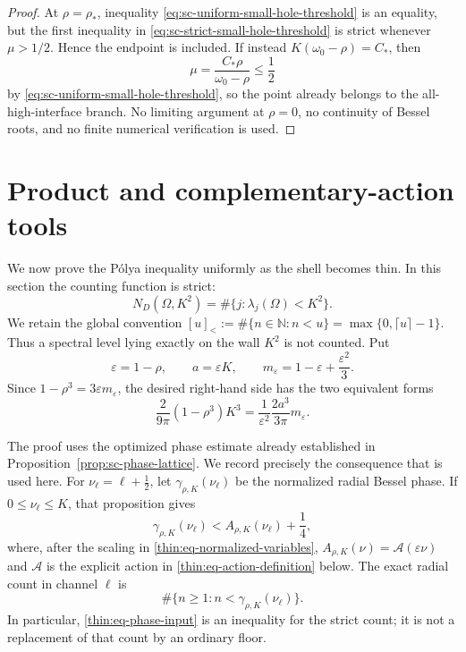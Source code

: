\documentclass[11pt]{article}
\numberwithin{equation}{section}
\theoremstyle{definition}
\theoremstyle{remark}
\begin{document}
\begin{proof}
At \(\rho=\rho_*\), inequality
\eqref{eq:sc-uniform-small-hole-threshold} is an equality, but the first
inequality in \eqref{eq:sc-strict-small-hole-threshold} is strict whenever
\(\mu>1/2\).  Hence the endpoint is included.  If instead
\(K(\omega_0-\rho)=C_*\), then
\[
  \mu=\frac{C_*\rho}{\omega_0-\rho}\le\frac12
\]
by \eqref{eq:sc-uniform-small-hole-threshold}, so the point already belongs
to the all-high-interface branch.  No limiting argument at \(\rho=0\), no
continuity of Bessel roots, and no finite numerical verification is used.
\end{proof}

\fi

\section{Product and complementary-action tools}
\label{sec:product-action-tools}

We now prove the P\'olya inequality uniformly as the shell becomes thin.  In
this section the counting function is strict:
\[
  N_D(\Omega,K^2)=\#\{j:\lambda_j(\Omega)<K^2\}.
\]
We retain the global convention
\([u]_<:=\#\{n\in\mathbb N:n<u\}=\max\{0,\lceil u\rceil-1\}\).
Thus a spectral level lying exactly on the wall \(K^2\) is not counted.  Put
\begin{equation}
  \varepsilon=1-\rho,
  \qquad a=\varepsilon K,
  \qquad
  m_\varepsilon=1-\varepsilon+\frac{\varepsilon^2}{3}.
  \label{thin:eq-normalized-variables}
\end{equation}
Since \(1-\rho^3=3\varepsilon m_\varepsilon\), the desired right-hand side
has the two equivalent forms
\begin{equation}
  \frac{2}{9\pi}(1-\rho^3)K^3
  =\frac{1}{\varepsilon^2}\frac{2a^3}{3\pi}m_\varepsilon.
  \label{thin:eq-weyl-normalization}
\end{equation}

The proof uses the optimized phase estimate already established in
Proposition~\ref{prop:sc-phase-lattice}.  We record precisely the consequence
that is used here.  For
\(\nu_\ell=\ell+\tfrac12\), let
\(\gamma_{\rho,K}(\nu_\ell)\) be the normalized radial Bessel phase.  If
\(0\leq\nu_\ell\leq K\), that proposition gives
\begin{equation}
  \gamma_{\rho,K}(\nu_\ell)
  < A_{\rho,K}(\nu_\ell)+\frac14,
  \label{thin:eq-phase-input}
\end{equation}
where, after the scaling in \eqref{thin:eq-normalized-variables},
\(A_{\rho,K}(\nu)=\mathcal A(\varepsilon\nu)\) and
\(\mathcal A\) is the explicit action in
\eqref{thin:eq-action-definition} below.  The exact radial count in channel
\(\ell\) is
\begin{equation}
  \#\{n\geq1:n<\gamma_{\rho,K}(\nu_\ell)\}.
  \label{thin:eq-exact-phase-count}
\end{equation}
In particular, \eqref{thin:eq-phase-input} is an inequality for the strict
count; it is not a replacement of that count by an ordinary floor.
\end{document}
